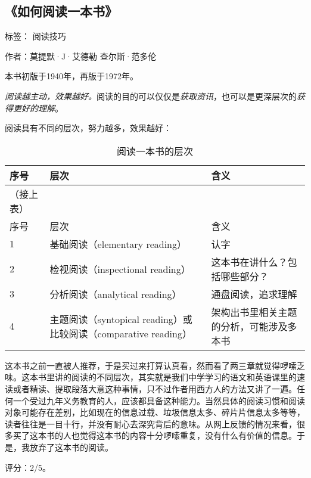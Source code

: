 \subsection{《如何阅读一本书》}

标签： 阅读技巧

作者：莫提默·J·艾德勒 查尔斯·范多伦

本书初版于1940年，再版于1972年。

\emph{阅读越主动，效果越好。}阅读的目的可以仅仅是\emph{获取资讯}，也可以是更深层次的\emph{获得更好的理解}。

阅读具有不同的层次，努力越多，效果越好：

\begin{longtable}{p{} | p{} | p{}}

    \caption{阅读一本书的层次} \\
    \hline
序号 & 层次 & 含义 \\
\hline
\endfirsthead

（接上表） \\
序号 & 层次 & 含义 \\
\hline
\endhead

\hline
\endfoot

1 & 基础阅读（elementary reading） & 认字 \\
2 & 检视阅读（inspectional reading） & 这本书在讲什么？包括哪些部分？ \\
3 & 分析阅读（analytical reading） & 通盘阅读，追求理解 \\
4 & 主题阅读（syntopical reading）或比较阅读（comparative reading） & 架构出书里相关主题的分析，可能涉及多本书 \\
\end{longtable}

这本书之前一直被人推荐，于是买过来打算认真看，然而看了两三章就觉得啰嗦乏味。这本书里讲的阅读的不同层次，其实就是我们中学学习的语文和英语课里的速读或者精读、提取段落大意这种事情，只不过作者用西方人的方法又讲了一遍。任何一个受过九年义务教育的人，应该都具备这种能力。当然具体的阅读习惯和阅读对象可能存在差别，比如现在的信息过载、垃圾信息太多、碎片片信息太多等等，读者往往是一目十行，并没有耐心去深究背后的意味。从网上反馈的情况来看，很多买了这本书的人也觉得这本书的内容十分啰嗦重复，没有什么有价值的信息。于是，我放弃了这本书的阅读。

评分：2/5。